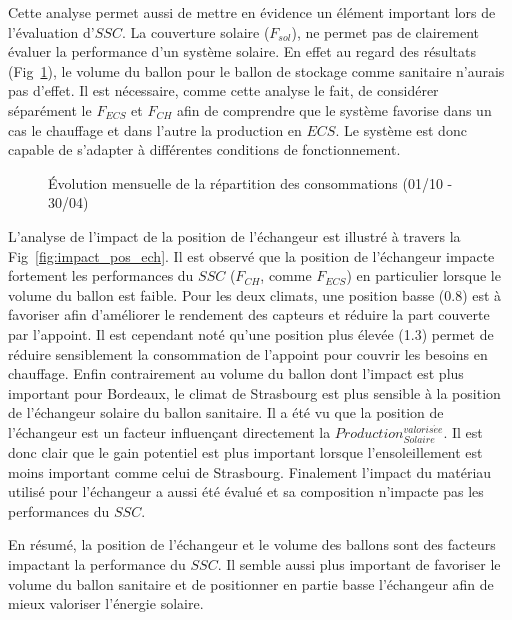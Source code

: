 Cette analyse permet aussi de mettre en évidence un élément important lors de l’évaluation
d’$SSC$. La couverture solaire ($F_{sol}$), ne permet pas de clairement évaluer la
performance d’un système solaire. En effet au regard des résultats (Fig~\ref{fig:importance_chauffage_ecs}),
le volume du ballon pour le ballon de stockage comme sanitaire n’aurais pas d’effet.
Il est nécessaire, comme cette analyse le fait, de considérer séparément le $F_{ECS}$
et $F_{CH}$ afin de comprendre que le système favorise dans un cas le chauffage et dans
l’autre la production en $ECS$. Le système est donc capable de s’adapter à différentes
conditions de fonctionnement.


\begin{figure}
    \begin{center}
    \end{center}
    \caption{Évolution mensuelle de la répartition des consommations (01/10 - 30/04)
             \label{fig:importance_chauffage_ecs}}
\end{figure}


L’analyse de l’impact de la position de l’échangeur est illustré à travers la Fig~\ref{fig:impact_pos_ech}.
Il est observé que la position de l’échangeur impacte fortement les performances du $SSC$
($F_{CH}$, comme $F_{ECS}$) en particulier lorsque le volume du ballon est faible. Pour les deux climats, une position
basse (\num{0.8}) est à favoriser afin d’améliorer le rendement des capteurs et réduire la part
couverte par l’appoint. Il est cependant noté qu’une position plus élevée (\num{1.3}) permet
de réduire sensiblement la consommation de l’appoint pour couvrir les besoins en
chauffage. Enfin contrairement au volume du ballon dont l’impact est plus important
pour Bordeaux, le climat de Strasbourg est plus sensible à la position de l’échangeur
solaire du ballon sanitaire. Il a été vu que la position de l’échangeur est un facteur
influençant directement la $Production_{Solaire}^{valoris\acute ee}$. Il est donc
clair que le gain potentiel est plus important lorsque l’ensoleillement est moins
important comme celui de Strasbourg. Finalement l’impact du matériau utilisé pour l’échangeur
a aussi été évalué et sa composition n’impacte pas les performances du $SSC$.

En résumé, la position de l’échangeur et le volume des ballons sont des facteurs
impactant la performance du $SSC$. Il semble aussi plus important de favoriser
le volume du ballon sanitaire et de positionner en partie basse l’échangeur afin
de mieux valoriser l’énergie solaire.

